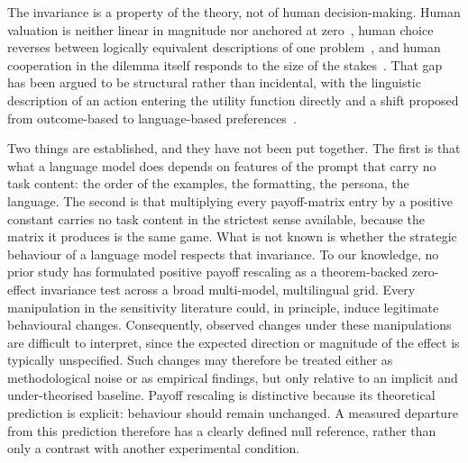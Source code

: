 \documentclass[11pt,a4paper]{article}
\begin{document}
The invariance is a property of the theory, not of human decision-making. Human valuation is neither
linear in magnitude nor anchored at zero~\cite{kahneman1979prospect}, human
choice reverses between logically equivalent descriptions of one
problem~\cite{tversky1981framing}, and human cooperation in the dilemma itself
responds to the size of the stakes~\cite{krockow2016cooperation,list2006friend}.
That gap has been argued to be structural rather than incidental, with the
linguistic description of an action entering the utility function directly and
a shift proposed from outcome-based to language-based
preferences~\cite{capraro2024language}.

Two things are established, and they have not been put together. The first is
that what a language model does depends on features of the prompt that carry no
task content: the order of the examples, the formatting, the persona, the
language. The second is that multiplying every payoff-matrix entry by a positive constant
carries no task content in the strictest sense available, because the matrix it
produces is  the same game. What is not known is whether
the strategic behaviour of a language model respects that invariance. To our
knowledge, no prior study has formulated positive payoff rescaling as a
theorem-backed zero-effect invariance test across a broad multi-model,
multilingual grid. Every manipulation in the sensitivity literature could, in principle, induce legitimate behavioural changes.  
Consequently, observed changes under these manipulations are difficult to interpret, since the expected direction or magnitude of the effect is typically unspecified. Such changes may therefore be treated either as methodological noise or as empirical findings, but only relative to an implicit and under-theorised baseline. Payoff rescaling is distinctive because its theoretical prediction is explicit: behaviour should remain unchanged. A measured departure from this prediction therefore has a clearly defined null reference, rather than only a contrast with another experimental condition.
\end{document}
